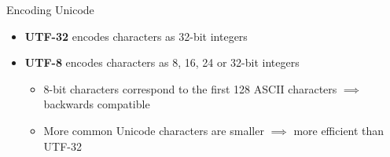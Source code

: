 \begin{frame}{Encoding Unicode}
    \begin{itemize}
		\pause\item \textbf{UTF-32} encodes characters as 32-bit integers
		\pause\item \textbf{UTF-8} encodes characters as 8, 16, 24 or 32-bit integers
			\begin{itemize}
			    \pause\item 8-bit characters correspond to the first 128 ASCII characters
			        $\implies$ backwards compatible
				\pause\item More common Unicode characters are smaller
				    $\implies$ more efficient than UTF-32
			\end{itemize}
	\end{itemize}
\end{frame}

	

